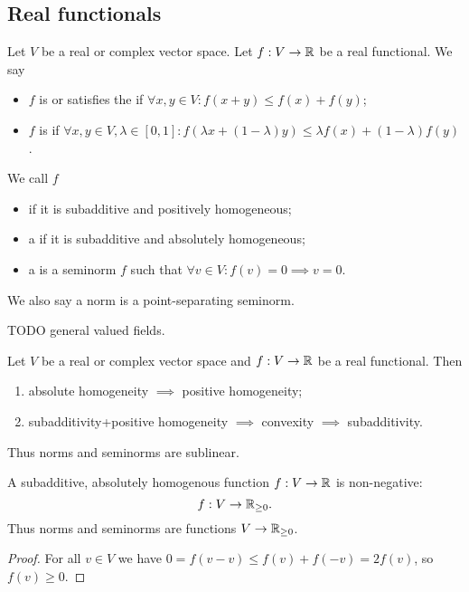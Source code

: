 \subsection{Real functionals}
\begin{definition}
Let $V$ be a real or complex vector space. Let $f: V\to \mathbb{R}$ be a real functional. We say
\begin{itemize}
\item $f$ is  or satisfies the  if $\forall x,y\in V: f(x+y) \leq f(x) + f(y)$;
\item $f$ is  if $\forall x,y\in V, \lambda\in[0,1]: f(\lambda x + (1-\lambda)y) \leq \lambda f(x) + (1-\lambda)f(y)$.
\end{itemize}
We call $f$
\begin{itemize}
\item {} if it is subadditive and positively homogeneous;
\item a  if it is subadditive and absolutely homogeneous;
\item a  is a seminorm $f$ such that $\forall v\in V: f(v) = 0 \implies v = 0$.
\end{itemize}
\end{definition}
We also say a norm is a point-separating seminorm.

TODO general valued fields.

\begin{lemma}
Let $V$ be a real or complex vector space and $f: V\to \mathbb{R}$ be a real functional. Then
\begin{enumerate}
\item absolute homogeneity $\implies$ positive homogeneity;
\item subadditivity+positive homogeneity $\implies$ convexity $\implies$ subadditivity.
\end{enumerate}
\end{lemma}
Thus norms and seminorms are sublinear.

\begin{lemma} \label{seminormPositivity}
A subadditive, absolutely homogenous function $f:V\to \mathbb{R}$ is non-negative:
\[ f: V\to \mathbb{R}_{\geq 0}. \]
Thus norms and seminorms are functions $V\to \mathbb{R}_{\geq 0}$.
\end{lemma}
\begin{proof}
For all $v\in V$ we have $0 = f(v-v) \leq f(v)+f(-v) = 2f(v)$, so $f(v) \geq 0$.
\end{proof}

